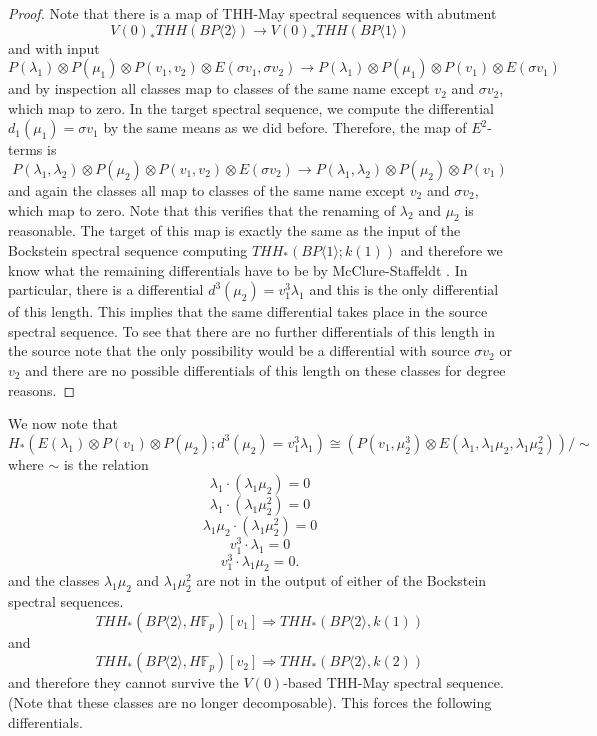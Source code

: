 \begin{proof}
Note that there is a map of THH-May spectral sequences with abutment 
\[V(0)_*THH(BP\langle2\rangle)\rightarrow V(0)_*THH(BP\langle 1 \rangle )\] 
and with input 
\[ P(\lambda_1)\otimes P(\mu_1)\otimes P(v_1,v_2)\otimes E(\sigma v_1,\sigma v_2) \rightarrow P(\lambda_1)\otimes P(\mu_1) \otimes P(v_1)\otimes E(\sigma v_1) \]
and by inspection all classes map to classes of the same name except $v_2$ and $\sigma v_2$, which map to zero. In the target spectral sequence, we compute the differential $d_1(\mu_1)=\sigma v_1$ by the same means as we did before. Therefore, the map of $E^2$-terms is 
\[ P(\lambda_1,\lambda_2)\otimes P(\mu_2)\otimes P(v_1,v_2)\otimes E(\sigma v_2) \rightarrow  P(\lambda_1,\lambda_2)\otimes P(\mu_2)\otimes P(v_1) \]
and again the classes all map to classes of the same name except $v_2$ and $\sigma v_2$, which map to zero. Note that this verifies that the renaming of $\lambda_2$ and $\mu_2$ is reasonable. The target of this map is exactly the same as the input of the Bockstein spectral sequence computing $THH_*(BP\langle 1\rangle ; k(1))$ and therefore we know what the remaining differentials have to be by McClure-Staffeldt \cite{McClureStaffeldt}. In particular, there is a differential $d^3(\mu_2)=v_1^3\lambda_1$ and this is the only differential of this length. This implies that the same differential takes place in the source spectral sequence. To see that there are no further differentials of this length in the source note that the only possibility would be a differential with source $\sigma v_2$ or $v_2$ and there are no possible differentials of this length on these classes for degree reasons. 
\end{proof}
We now note that 
\[ H_*(E(\lambda_1)\otimes P(v_1)\otimes P(\mu_2 ); d^3(\mu_2)=v_1^3\lambda_1) \cong \left (P(v_1,\mu_2^3)\otimes E(\lambda_1, \lambda_1\mu_2, \lambda_1\mu_2^2)\right )/\sim\]
where $\sim$ is the relation 
\[ \lambda_1\cdot (\lambda_1\mu_2) =0 \]
\[ \lambda_1\cdot (\lambda_1\mu_2^2) =0 \]
\[ \lambda_1\mu_2 \cdot (\lambda_1\mu_2^2) =0 \]
\[ v_1^3\cdot \lambda_1 =0 \]
\[ v_1^3 \cdot \lambda_1\mu_2 = 0. \]
and the classes $\lambda_1\mu_2$ and $\lambda_1\mu_2^2$ are not in the output of either of the Bockstein spectral sequences. 
\[ THH_*(BP\langle 2\rangle , H\mathbb{F}_p)[v_1] \Rightarrow  THH_*(BP\langle 2 \rangle , k(1) ) \]
and 
\[ THH_*(BP\langle 2\rangle , H\mathbb{F}_p)[v_2] \Rightarrow  THH_*(BP\langle 2 \rangle , k(2) )\]
and therefore they cannot survive the $V(0)$-based THH-May spectral sequence. (Note that these classes are no longer decomposable). This forces the following differentials. 
